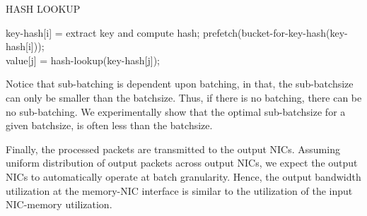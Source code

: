 \begin{algorithm}[H]
 \caption{HASH LOOKUP}
 \label{lookup-algo}
 \begin{algorithmic}[1]
     \State key-hash[i] = extract key and compute hash; \label{hash-compute-line}
     \State prefetch(bucket-for-key-hash(key-hash[i])); \label{prefetch-line}
 \EndFor
 \\
     \State value[j] = hash-lookup(key-hash[j]); \label{hash-lookup-line}
 \EndFor
 \end{algorithmic}
\end{algorithm}
Notice that sub-batching is dependent upon batching, in that, the sub-batchsize can only be smaller than the batchsize. Thus, if there is no
batching, there can be no sub-batching. We experimentally show that the optimal sub-batchsize for a given batchsize, is often less than the
batchsize.

Finally, the processed packets are transmitted to the output NICs. Assuming uniform distribution of output packets
across output NICs, we expect the output NICs to automatically operate at batch granularity. Hence, the output bandwidth
utilization at the memory-NIC interface is similar to the utilization of the input NIC-memory utilization.

